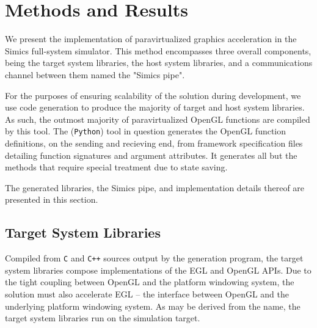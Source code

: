 
\section{Methods and Results}
\label{sec:methodsandresults}
We present the implementation of paravirtualized graphics acceleration in the Simics full-system simulator.
This method encompasses three overall components, being the target system libraries, the host system libraries, and a communications channel between them named the "Simics pipe".

For the purposes of ensuring scalability of the solution during development, we use code generation to produce the majority of target and host system libraries.
As such, the outmost majority of paravirtualized OpenGL functions are compiled by this tool.
The (\texttt{Python}) tool in question generates the OpenGL function definitions, on the sending and recieving end, from framework specification files detailing function signatures and argument attributes.
It generates all but the methods that require special treatment due to state saving.

The generated libraries, the Simics pipe, and implementation details thereof are presented in this section.

\subsection{Target System Libraries}
\label{sec:proposedsolutionandimplementation_targetsystemlibraries}
Compiled from \texttt{C} and \texttt{C++} sources output by the generation program, the target system libraries compose implementations of the EGL and OpenGL APIs.
Due to the tight coupling between OpenGL and the platform windowing system, the solution must also accelerate EGL -- the interface between OpenGL and the underlying platform windowing system.
As may be derived from the name, the target system libraries run on the simulation target.

